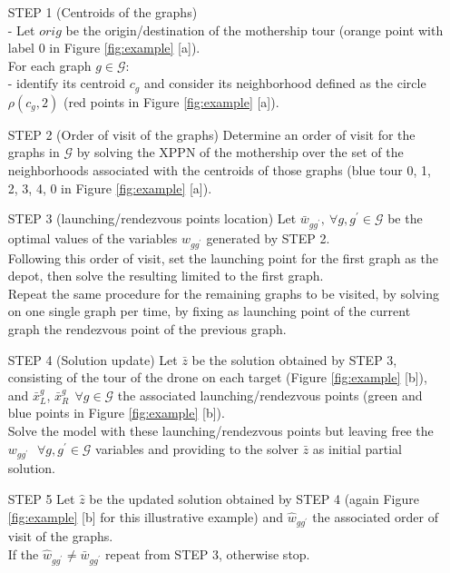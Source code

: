 \begin{itemize} 
\item[STEP 1] (Centroids of the graphs)\\
- Let $orig$ be the origin/destination of the mothership tour (orange point with label $0$ in Figure \ref{fig:example} [a]).\\
For each graph $g \in \mathcal G$:\\
- identify its centroid $c_g$ and consider its neighborhood defined as the circle $\rho(c_g,2)$ (red points in Figure \ref{fig:example} [a]).
\item[STEP 2] (Order of visit of the graphs)
Determine an order of visit for the graphs in $\mathcal{G}$ by solving the XPPN of the mothership over the set of the neighborhoods associated with the centroids of those graphs (blue tour 0, 1, 2, 3, 4, 0 in Figure  \ref{fig:example} [a]).\\

\item[STEP 3] (launching/rendezvous points location)
Let $\bar{w}_{gg^{'}}, \: \forall g,g^{'} \in \mathcal G$ be the optimal values of the variables $w_{gg^{'}}$ generated by STEP 2.\\
Following this order of visit, set the launching point for the first graph as the depot, then solve the resulting \AMD\xspace limited to the first graph.\\
Repeat the same procedure for the remaining graphs to be visited, by solving \AMD\xspace on one single graph per time, by fixing as launching point of the current graph the rendezvous point of the previous graph.

\item [STEP 4] (Solution update) 
Let $\bar{z}$ be the solution obtained by STEP 3, consisting of the tour of the drone on each target  (Figure \ref{fig:example} [b]), and $\bar{x}_{L}^{g}$, $\bar{x}_{R}^{g} \:\: \forall g \in \mathcal G$ the associated launching/rendezvous points (green and blue points in Figure \ref{fig:example} [b]).\\
Solve the model \AMD\xspace with these launching/rendezvous points but leaving free the $w_{gg^{'}} \:\:\ \forall g,g^{'} \in \mathcal G$ variables and providing to the solver $\bar{z}$ as initial partial solution.
\item [STEP 5]
Let $\hat{z}$ be the updated solution obtained by STEP 4 (again Figure \ref{fig:example} [b] for this illustrative example) and $\hat{w}_{gg^{'}}$ the associated order of visit of the graphs.\\
If the $\hat{w}_{gg^{'}} \neq \bar{w}_{gg^{'}}$ repeat from STEP 3, otherwise stop.
\end{itemize}

